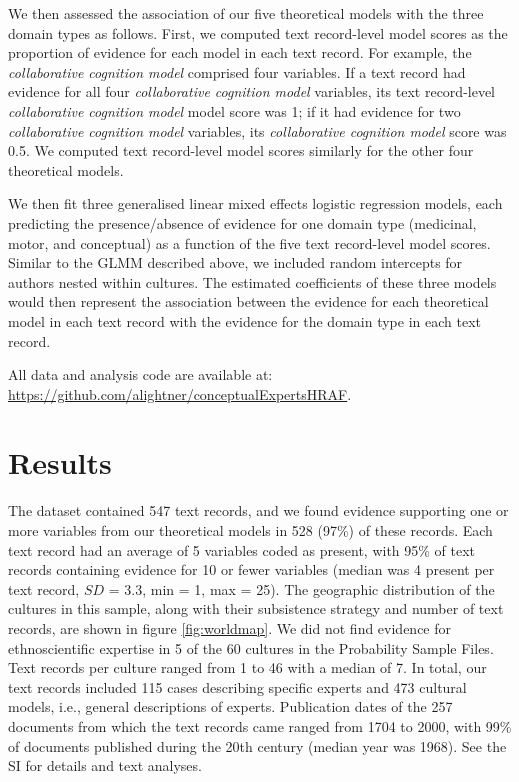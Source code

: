 \documentclass[
  11pt,
]{article}
\begin{document}
We then assessed the association of our five theoretical models with the three domain types as follows. First, we computed text record-level model scores as the proportion of evidence for each model in each text record. For example, the \emph{collaborative cognition model} comprised four variables. If a text record had evidence for all four \emph{collaborative cognition model} variables, its text record-level \emph{collaborative cognition model} model score was 1; if it had evidence for two \emph{collaborative cognition model} variables, its \emph{collaborative cognition model} score was 0.5. We computed text record-level model scores similarly for the other four theoretical models.

We then fit three generalised linear mixed effects logistic regression models, each predicting the presence/absence of evidence for one domain type (medicinal, motor, and conceptual) as a function of the five text record-level model scores. Similar to the GLMM described above, we included random intercepts for authors nested within cultures. The estimated coefficients of these three models would then represent the association between the evidence for each theoretical model in each text record with the evidence for the domain type in each text record.

All data and analysis code are available at: \url{https://github.com/alightner/conceptualExpertsHRAF}.

\hypertarget{results}{%
\section{Results}\label{results}}

The dataset contained 547 text records, and we found evidence supporting one or more variables from our theoretical models in 528 (97\%) of these records. Each text record had an average of 5 variables coded as present, with 95\% of text records containing evidence for 10 or fewer variables (median was 4 present per text record, \(SD\) = 3.3, min = 1, max = 25). The geographic distribution of the cultures in this sample, along with their subsistence strategy and number of text records, are shown in figure \ref{fig:worldmap}. We did not find evidence for ethnoscientific expertise in 5 of the 60 cultures in the Probability Sample Files. Text records per culture ranged from 1 to 46 with a median of 7. In total, our text records included 115 cases describing specific experts and 473 cultural models, i.e., general descriptions of experts. Publication dates of the 257 documents from which the text records came ranged from 1704 to 2000, with 99\% of documents published during the 20th century (median year was 1968). See the SI for details and text analyses.
\end{document}
